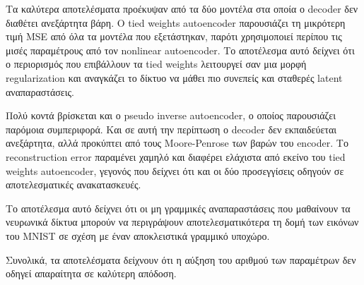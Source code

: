 \documentclass[12pt]{article}
\begin{document}
Τα καλύτερα αποτελέσματα προέκυψαν από τα δύο μοντέλα στα οποία ο decoder δεν διαθέτει ανεξάρτητα βάρη. Ο tied weights autoencoder παρουσιάζει 
τη μικρότερη τιμή MSE από όλα τα μοντέλα που εξετάστηκαν, παρότι χρησιμοποιεί περίπου τις μισές παραμέτρους από τον nonlinear autoencoder. 
Το αποτέλεσμα αυτό δείχνει ότι ο περιορισμός που επιβάλλουν τα tied weights λειτουργεί σαν μια μορφή regularization και αναγκάζει το δίκτυο να 
μάθει πιο συνεπείς και σταθερές latent αναπαραστάσεις.

Πολύ κοντά βρίσκεται και ο pseudo inverse autoencoder, ο οποίος παρουσιάζει παρόμοια συμπεριφορά. Και σε αυτή την περίπτωση ο decoder δεν 
εκπαιδεύεται ανεξάρτητα, αλλά προκύπτει από τους Moore-Penrose των βαρών του encoder. Το reconstruction error παραμένει χαμηλό και διαφέρει 
ελάχιστα από εκείνο του tied weights autoencoder, γεγονός που δείχνει ότι και οι δύο προσεγγίσεις οδηγούν σε αποτελεσματικές ανακατασκευές.

Το αποτέλεσμα αυτό δείχνει ότι οι μη γραμμικές αναπαραστάσεις που μαθαίνουν 
τα νευρωνικά δίκτυα μπορούν να περιγράψουν αποτελεσματικότερα τη δομή των εικόνων του MNIST σε σχέση με έναν αποκλειστικά γραμμικό υποχώρο.

Συνολικά, τα αποτελέσματα δείχνουν ότι η αύξηση του αριθμού των παραμέτρων δεν οδηγεί απαραίτητα σε καλύτερη απόδοση. 
\end{document}
